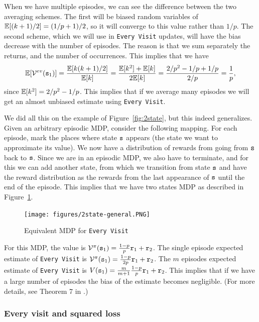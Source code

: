 \begin{advanced}
When we have multiple episodes, we can see the difference between
the two averaging schemes. The first will be biased random variables
of $\mathbb{E}[(k+1)/2]=(1/p+1)/2$, so it will converge to this value rather
than $1/p$. The second scheme, which we will use in {\tt Every
Visit} updates, will have the bias decrease with the number of
episodes. The reason is that we sum separately the returns, and the
number of occurrences. This implies that we have
\[
\mathbb{E}[\mathcal{V}^{ev}({\tt s}_1)]=\frac{\mathbb{E}[k(k+1)/2]}{\mathbb{E}[k]}=\frac{\mathbb{E}[k^2]+\mathbb{E}[k]}{2\mathbb{E}[k]}=
\frac{2/p^2-1/p+1/p}{2/p}=\frac{1}{p},
\]
since $\mathbb{E}[k^2]=2/p^2-1/p$. This implies that if we average many
episodes we will get an almost unbiased estimate using {\tt Every
Visit}.

We did all this on the example of Figure~\ref{fig:2state}, but this
indeed generalizes. Given an arbitrary episodic MDP, consider the
following mapping. For each episode, mark the places where state
${\tt s}$ appears (the state we want to approximate its value). We
now have a distribution of rewards from going from ${\tt s}$ back to
${\tt s}$. Since we are in an episodic MDP, we also have to
terminate, and for this we can add another state, from which we
transition from state ${\tt s}$ and have the reward distribution as
the rewards from the last appearance of ${\tt s}$ until the end of
the episode.
This implies that we have two states MDP as described in
Figure~\ref{fig:2state-general}.
\begin{figure}
\begin{center}
\texttt{[image: figures/2state-general.PNG]}    
\end{center}
\caption{Equivalent MDP for {\tt Every Visit}}\label{fig:2state-general}
\end{figure}

For this MDP, the value is
$\mathcal{V}^\pi({\tt s}_1)=\frac{1-p}{p}{\tt r}_1+{\tt r}_2$. The single
episode expected estimate of {\tt Every Visit} is
$\mathcal{V}^\pi({\tt s}_1)=\frac{1-p}{2p}{\tt r}_1+{\tt r}_2$. The $m$
episodes expected estimate of {\tt Every Visit} is
$V({\tt s}_1)=\frac{m}{m+1}\frac{1-p}{p}{\tt r}_1+{\tt r}_2$. This
implies that if we have a large number of episodes the bias of the
estimate becomes negligible. (For more details, see Theorem 7 in
\cite{SinghS96}.)


\subsubsection*{Every visit and squared loss}


\end{advanced}
